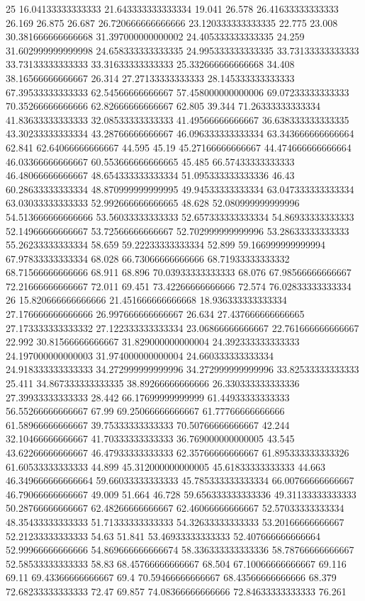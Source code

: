 25 16.04133333333333 21.643333333333334 19.041 26.578 26.41633333333333 26.169 26.875 26.687 26.720666666666666 23.120333333333335 22.775 23.008 30.381666666666668 31.397000000000002 24.405333333333335 24.259 31.602999999999998 24.658333333333335 24.995333333333335 33.73133333333333 33.73133333333333 33.31633333333333 25.332666666666668 34.408 38.16566666666667 26.314 27.27133333333333 28.145333333333333 67.39533333333333 62.54566666666667 57.458000000000006 69.07233333333333 70.35266666666666 62.82666666666667 62.805 39.344 71.26333333333334 41.83633333333333 32.08533333333333 41.49566666666667 36.638333333333335 43.30233333333334 43.28766666666667 46.096333333333334 63.343666666666664 62.841 62.64066666666667 44.595 45.19 45.27166666666667 44.474666666666664 46.03366666666667 60.553666666666665 45.485 66.57433333333333 46.48066666666667 48.654333333333334 51.095333333333336 46.43 60.28633333333334 48.870999999999995 49.94533333333334 63.047333333333334 63.03033333333333 52.992666666666665 48.628 52.080999999999996 54.513666666666666 53.56033333333333 52.657333333333334 54.86933333333333 52.14966666666667 53.72566666666667 52.702999999999996 53.28633333333333 55.26233333333334 58.659 59.22233333333334 52.899 59.166999999999994 67.97833333333334 68.028 66.73066666666666 68.71933333333332 68.71566666666666 68.911 68.896 70.03933333333333 68.076 67.98566666666667 72.21666666666667 72.011 69.451 73.42266666666666 72.574 76.02833333333334
26 15.820666666666666 21.451666666666668 18.936333333333334 27.176666666666666 26.997666666666667 26.634 27.437666666666665 27.173333333333332 27.122333333333334 23.06866666666667 22.761666666666667 22.992 30.81566666666667 31.829000000000004 24.392333333333333 24.197000000000003 31.974000000000004 24.660333333333334 24.918333333333333 34.272999999999996 34.272999999999996 33.82533333333333 25.411 34.867333333333335 38.89266666666666 26.330333333333336 27.39933333333333 28.442 66.17699999999999 61.44933333333333 56.55266666666667 67.99 69.25066666666667 61.77766666666666 61.58966666666667 39.75333333333333 70.50766666666667 42.244 32.10466666666667 41.70333333333333 36.769000000000005 43.545 43.62266666666667 46.47933333333333 62.35766666666667 61.895333333333326 61.60533333333333 44.899 45.312000000000005 45.61833333333333 44.663 46.349666666666664 59.66033333333333 45.785333333333334 66.00766666666667 46.79066666666667 49.009 51.664 46.728 59.656333333333336 49.31133333333333 50.28766666666667 62.48266666666667 62.46066666666667 52.57033333333334 48.35433333333333 51.71333333333333 54.32633333333333 53.20166666666667 52.21233333333333 54.63 51.841 53.46933333333333 52.407666666666664 52.99966666666666 54.869666666666674 58.336333333333336 58.78766666666667 52.58533333333333 58.83 68.45766666666667 68.504 67.10066666666667 69.116 69.11 69.43366666666667 69.4 70.59466666666667 68.43566666666666 68.379 72.68233333333333 72.47 69.857 74.08366666666666 72.84633333333333 76.261
